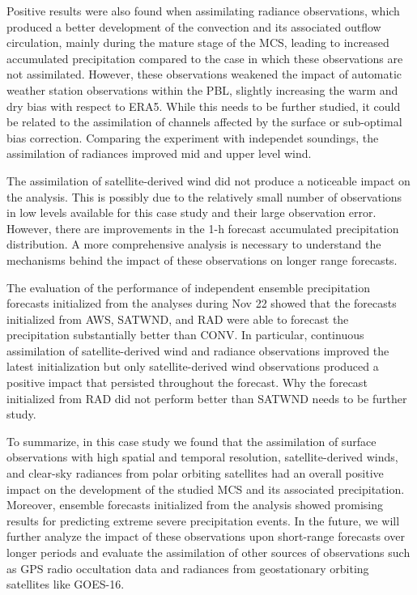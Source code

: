 \documentclass[preprint, 3p, authoryear,review, 12pt]{elsarticle} %
\begin{document}
Positive results were also found when assimilating radiance observations, which produced a better development of the convection and its associated outflow circulation, mainly during the mature stage of the MCS, leading to increased accumulated precipitation compared to the case in which these observations are not assimilated. However, these observations weakened the impact of automatic weather station observations within the PBL, slightly increasing the warm and dry bias with respect to ERA5. While this needs to be further studied, it could be related to the assimilation of channels affected by the surface or sub-optimal bias correction. Comparing the experiment with independet soundings, the assimilation of radiances improved mid and upper level wind.

The assimilation of satellite-derived wind did not produce a noticeable impact on the analysis. This is possibly due to the relatively small number of observations in low levels available for this case study and their large observation error. However, there are improvements in the 1-h forecast accumulated precipitation distribution. A more comprehensive analysis is necessary to understand the mechanisms behind the impact of these observations on longer range forecasts.

The evaluation of the performance of independent ensemble precipitation forecasts initialized from the analyses during Nov 22 showed that the forecasts initialized from AWS, SATWND, and RAD were able to forecast the precipitation substantially better than CONV. In particular, continuous assimilation of satellite-derived wind and radiance observations improved the latest initialization but only satellite-derived wind observations produced a positive impact that persisted throughout the forecast. Why the forecast initialized from RAD did not perform better than SATWND needs to be further study.

To summarize, in this case study we found that the assimilation of surface observations with high spatial and temporal resolution, satellite-derived winds, and clear-sky radiances from polar orbiting satellites had an overall positive impact on the development of the studied MCS and its associated precipitation. Moreover, ensemble forecasts initialized from the analysis showed promising results for predicting extreme severe precipitation events. In the future, we will further analyze the impact of these observations upon short-range forecasts over longer periods and evaluate the assimilation of other sources of observations such as GPS radio occultation data and radiances from geostationary orbiting satellites like GOES-16.
\end{document}

